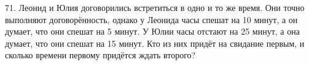71. Леонид и Юлия договорились встретиться в одно и то же время. Они точно выполняют договорённость, однако у Леонида часы спешат на 10 минут, а он думает, что они спешат на 5 минут. У Юлии часы отстают на 25 минут, а она думает, что они спешат на 15 минут. Кто из них придёт на свидание первым, и сколько времени первому придётся ждать второго?\\
